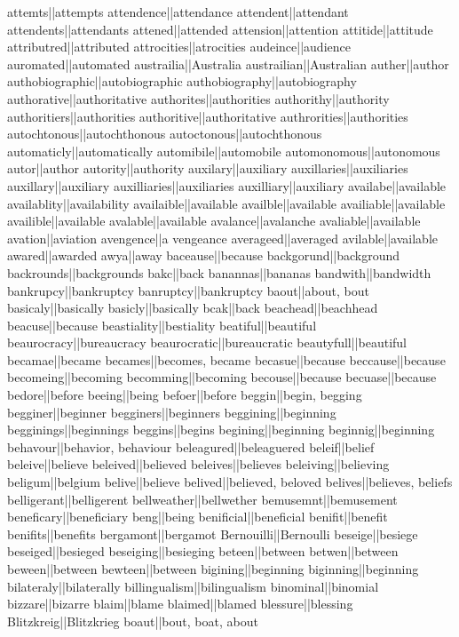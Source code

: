 attemts||attempts
attendence||attendance
attendent||attendant
attendents||attendants
attened||attended
attension||attention
attitide||attitude
attributred||attributed
attrocities||atrocities
audeince||audience
auromated||automated
austrailia||Australia
austrailian||Australian
auther||author
authobiographic||autobiographic
authobiography||autobiography
authorative||authoritative
authorites||authorities
authorithy||authority
authoritiers||authorities
authoritive||authoritative
authrorities||authorities
autochtonous||autochthonous
autoctonous||autochthonous
automaticly||automatically
automibile||automobile
automonomous||autonomous
autor||author
autority||authority
auxilary||auxiliary
auxillaries||auxiliaries
auxillary||auxiliary
auxilliaries||auxiliaries
auxilliary||auxiliary
availabe||available
availablity||availability
availaible||available
availble||available
availiable||available
availible||available
avalable||available
avalance||avalanche
avaliable||available
avation||aviation
avengence||a vengeance
averageed||averaged
avilable||available
awared||awarded
awya||away
baceause||because
backgorund||background
backrounds||backgrounds
bakc||back
banannas||bananas
bandwith||bandwidth
bankrupcy||bankruptcy
banruptcy||bankruptcy
baout||about, bout
basicaly||basically
basicly||basically
bcak||back
beachead||beachhead
beacuse||because
beastiality||bestiality
beatiful||beautiful
beaurocracy||bureaucracy
beaurocratic||bureaucratic
beautyfull||beautiful
becamae||became
becames||becomes, became
becasue||because
beccause||because
becomeing||becoming
becomming||becoming
becouse||because
becuase||because
bedore||before
beeing||being
befoer||before
beggin||begin, begging
begginer||beginner
begginers||beginners
beggining||beginning
begginings||beginnings
beggins||begins
begining||beginning
beginnig||beginning
behavour||behavior, behaviour
beleagured||beleaguered
beleif||belief
beleive||believe
beleived||believed
beleives||believes
beleiving||believing
beligum||belgium
belive||believe
belived||believed, beloved
belives||believes, beliefs
belligerant||belligerent
bellweather||bellwether
bemusemnt||bemusement
beneficary||beneficiary
beng||being
benificial||beneficial
benifit||benefit
benifits||benefits
bergamont||bergamot
Bernouilli||Bernoulli
beseige||besiege
beseiged||besieged
beseiging||besieging
beteen||between
betwen||between
beween||between
bewteen||between
bigining||beginning
biginning||beginning
bilateraly||bilaterally
billingualism||bilingualism
binominal||binomial
bizzare||bizarre
blaim||blame
blaimed||blamed
blessure||blessing
Blitzkreig||Blitzkrieg
boaut||bout, boat, about
